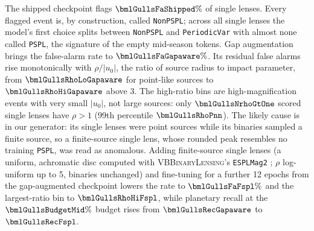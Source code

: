 The shipped checkpoint flags $\bmlGullsFaShipped\%$ of single lenses. Every flagged event is, by
construction, called \texttt{NonPSPL}; across all single lenses the model's first choice splits between
\texttt{NonPSPL} and \texttt{PeriodicVar} with almost none called \texttt{PSPL}, the signature of the
empty mid-season tokens. Gap augmentation brings the false-alarm rate to $\bmlGullsFaGapaware\%$. Its
residual false alarms rise monotonically with $\rho/|u_0|$, the ratio of source radius to impact
parameter, from $\bmlGullsRhoLoGapaware$ for point-like sources to $\bmlGullsRhoHiGapaware$ above 3.
The high-ratio bins are high-magnification events with very small $|u_0|$, not large sources: only
$\bmlGullsNrhoGtOne$ scored single lenses have $\rho > 1$ (99th percentile $\bmlGullsRhoPnn$). The
likely cause is in our generator: its single lenses were point sources while its binaries sampled a
finite source, so a finite-source single lens, whose rounded peak resembles no training \texttt{PSPL},
was read as anomalous. Adding finite-source single lenses (a uniform, achromatic disc computed with
\textsc{VBBinaryLensing}'s \texttt{ESPLMag2} \citep{Bozza2018}; $\rho$ log-uniform up to 5, binaries
unchanged) and fine-tuning for a further 12 epochs from the gap-augmented checkpoint lowers the rate to
$\bmlGullsFaFspl\%$ and the largest-ratio bin to $\bmlGullsRhoHiFspl$, while planetary recall at the
$\bmlGullsBudgetMid\%$ budget rises from $\bmlGullsRecGapaware$ to $\bmlGullsRecFspl$.


